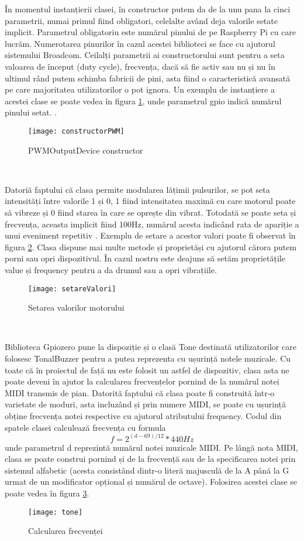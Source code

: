\documentclass[../IoMusT.tex]{subfiles}
\begin{document}
În momentul instanțierii clasei, în constructor putem da de la unu pana la cinci parametrii, numai primul fiind obligatori, celelalte având deja valorile setate implicit. Parametrul obligatoriu este numărul pinului de pe Raspberry Pi cu care lucrăm. Numerotarea pinurilor în cazul acestei biblioteci se face cu ajutorul sistemului Broadcom. Ceilalți parametrii ai constructorului sunt pentru a seta valoarea de început (duty cycle), frecvența, dacă să fie activ sau nu și nu în ultimul rând putem schimba fabricii de pini, asta fiind o caracteristică avansată pe care majoritatea utilizatorilor o pot ignora. Un exemplu de instanțiere a acestei clase se poate vedea în figura \ref{fig:constructor}, unde parametrul gpio indică numărul pinului setat. .
\begin{figure}[h]
\centering
\texttt{[image: constructorPWM]}
\caption{PWMOutputDevice constructor}
\label{fig:constructor}
\end{figure}
\\
\par Datoriă faptului că clasa permite modularea lățimii pulsurilor, se pot seta intensități între valorile 1 și 0, 1 fiind intensitatea maximă cu care motorul poate să vibreze și 0 fiind starea în care se oprește din vibrat. Totodată se poate seta și frecvența, aceasta implicit fiind 100Hz, numărul acesta indicând rata de apariție a unui eveniment repetitiv \cite{Freq}. Exemplu de setare a acestor valori poate fi observat în figura \ref{fig:val}. Clasa dispune mai multe metode și proprietăși cu ajutorul cărora putem porni sau opri dispozitivul. În cazul nostru este deajuns să setăm proprietățile value și frequency pentru a da drumul sau a opri vibrațiile. 
\begin{figure}[h]
\centering
\texttt{[image: setareValori]}
\caption{Setarea valorilor motorului}
\label{fig:val}
\end{figure}
\\
\par Biblioteca Gpiozero pune la dispoziție și o clasă Tone destinată utilizatorilor care folosesc TonalBuzzer pentru a putea reprezenta cu ușurință notele muzicale. Cu toate că în proiectul de față nu este folosit un astfel de dispozitiv, clasa asta ne poate deveni în ajutor la calcularea frecvențelor pornind de la numărul notei MIDI transmis de pian. Datorită faptului că clasa poate fi construită într-o varietate de moduri, asta incluzând și prin numere MIDI, se poate cu ușurință obține frecvența notei respective cu ajutorul atributului frequency. Codul din spatele clasei calculează frecvența cu formula
\[ f = 2^{(d-69)/12} * 440Hz\]
unde parametrul d reprezintă numărul notei muzicale MIDI. Pe lângă nota MIDI, clasa se poate construi pornind și de la frecvență sau de la specificarea notei prin sistemul alfabetic (acesta consistând dintr-o literă majusculă de la A până la G urmat de un modificator opțional și numărul de octave). Folosirea acestei clase se poate vedea în figura \ref{fig:tone}.
\begin{figure}[h]
\centering
\texttt{[image: tone]}
\caption{Calcularea frecvenței}
\label{fig:tone}
\end{figure}
\end{document}
